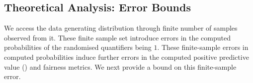 \iffalse
\red{While it is trivial to use conditional probability distribution for the RE encoding, it is not straightforward for the presented ER-encoding, which we leave as a future work. 
}
\fi

\begin{comment}
\red{Let $ \bool_i $ and $ \bool_j $ be two Boolean (non-sensitive) features and we want to encode their pair-wise correlation in {\justicia}. For an assignment to $ \bool_i, \bool_j $, we consider a new Boolean variable $ v $ and add a constraint $ v \leftrightarrow \bool_i \wedge \bool_j $ in the CNF $ \phi $ of the SSAT formula $ \Phi $. Additionally, $ v $ is given a randomized quantification in the prefix of $ \Phi $ and the probability of $ v $ is calculated as the probability of both $ \bool_i $ and $ \bool_j $ assigning to $ 1 $ in the distribution $ \mathcal{D} $. Note that, to encode the total correlation of all Boolean features, the mentioned approach introduces exponentially (with the number of features) many new variables and add an exponential number of constraints to $ \phi $ with an aim of computing a more precise satisfying probability of $ \Phi $. Optionally, one can encode the correlation among a selected set of features of interest in {\justicia}. }
\end{comment}


\subsection{Theoretical Analysis: Error Bounds}\label{fairness_justicia_sec:theory}
We access the data generating distribution through  finite number of samples observed from it. These finite sample set introduce errors in the computed probabilities of the randomised quantifiers being $1$. These finite-sample errors in computed probabilities induce further errors in the computed positive predictive value () and fairness metrics. We next provide a bound on this finite-sample error.

